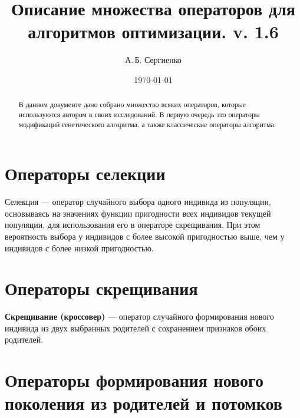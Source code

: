 \documentclass[a4paper,12pt]{article}
\title{Описание множества операторов для алгоритмов оптимизации. v. 1.6}
\author{А.\,Б. Сергиенко}
\date{\today}
\begin{document}


\maketitle

\begin{abstract}
В данном документе дано собрано множество всяких операторов, которые используются автором в своих исследований. В первую очередь это операторы модификаций генетического алгоритма, а также классические операторы алгоритма.
\end{abstract}

\tableofcontents

\newpage




\section{Операторы селекции}\label{SetOfOperatorsAlgorithms:section_selection}

Селекция --- оператор случайного выбора одного индивида из популяции, основываясь на значениях функции пригодности всех индивидов текущей популяции, для использования его в операторе скрещивания. При этом вероятность выбора у индивидов с более высокой пригодностью выше, чем у индивидов с более низкой пригодностью.






\section{Операторы скрещивания}\label{SetOfOperatorsAlgorithms:section_Crossover}

\textbf{Скрещивание (кроссовер)} --- оператор случайного формирования нового индивида из двух выбранных родителей с сохранением признаков обоих родителей.











\section{Операторы формирования нового поколения из родителей и потомков}\label{SetOfOperatorsAlgorithms:section_forming}
\end{document}

